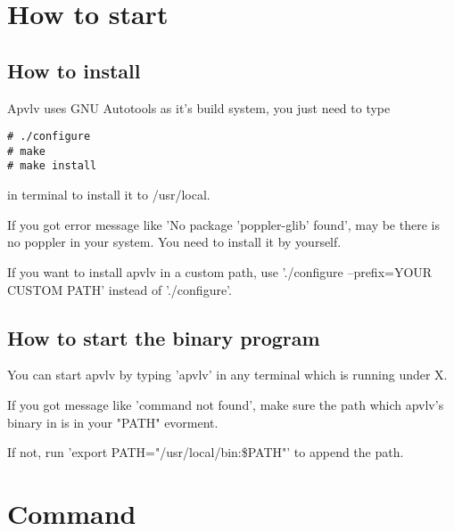 \documentclass[a4paper,12pt]{article}
\begin{document}
\section{How to start}

\subsection{How to install}

Apvlv uses GNU Autotools as it's build system, you just need to type
\begin{verbatim}
# ./configure
# make
# make install
\end{verbatim}
in terminal to install it to /usr/local.

If you got error message like 'No package 'poppler-glib' found', may be there is no poppler in your system. You need to install it by yourself.

If you want to install apvlv in a custom path, use './configure --prefix=YOUR CUSTOM PATH' instead of './configure'.

\subsection{How to start the binary program}

You can start apvlv by typing 'apvlv' in any terminal which is running under X.

If you got message like 'command not found', make sure the path which apvlv's binary in is in your "PATH" evorment. 

If not, run 'export PATH="/usr/local/bin:\$PATH"' to append the path.

\newpage

\section{Command}
\end{document}
